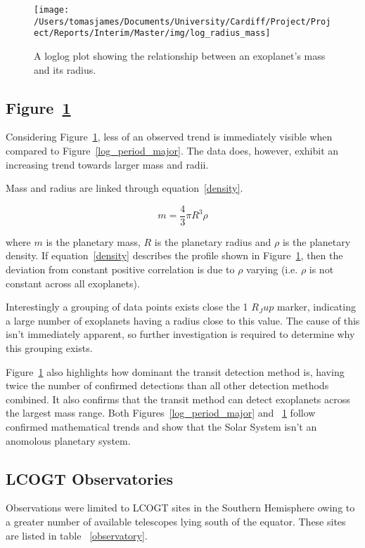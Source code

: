 \documentclass[twoside]{article}
\begin{document}
\begin{multicols}{2}
\begin{figure}[H]
\centering
    \texttt{[image: /Users/tomasjames/Documents/University/Cardiff/Project/Project/Reports/Interim/Master/img/log\_radius\_mass]}
\caption{A loglog plot showing the relationship between an exoplanet's mass and its radius.}\label{log_radius_mass}
\end{figure}

\subsection*{Figure~\ref{log_radius_mass}}
Considering Figure~\ref{log_radius_mass}, less of an observed trend is immediately visible when compared to Figure~\ref{log_period_major}. The data does, however, exhibit an increasing trend towards larger mass and radii.  

Mass and radius are linked through equation~\ref{density}. 

\begin{equation} \label{density}
    m = \frac{4}{3}\pi R^3 \rho
\end{equation}

 where $m$ is the planetary mass, $R$ is the planetary radius and $\rho$ is the planetary density. If equation~\ref{density} describes the profile shown in Figure~\ref{log_radius_mass}, then the deviation from constant positive correlation is due to $\rho$ varying (i.e. $\rho$ is not constant across all exoplanets). 

 Interestingly a grouping of data points exists close the 1 $R_Jup$ marker, indicating a large number of exoplanets having a radius close to this value. The cause of this isn't immediately apparent, so further investigation is required to determine why this grouping exists.

 Figure~\ref{log_radius_mass} also highlights how dominant the transit detection method is, having twice the number of confirmed detections than all other detection methods combined. It also confirms that the transit method can detect exoplanets across the largest mass range. Both Figures~\ref{log_period_major} and ~\ref{log_radius_mass} follow confirmed mathematical trends and show that the Solar System isn't an anomolous planetary system. 


\subsection{LCOGT Observatories}
Observations were limited to LCOGT sites in the Southern Hemisphere owing to a greater number of available telescopes lying south of the equator. These sites are listed in table ~\ref{observatory}.


\end{multicols}
\end{document}
